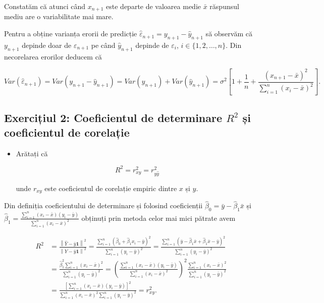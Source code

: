 \documentclass[]{article}
\newenvironment{frshaded*}{%
  \def\FrameCommand{\fboxrule=\FrameRule\fboxsep=\FrameSep \fcolorbox{framecolor}{shadecolor1}}%
  \MakeFramed {\advance\hsize-\width \FrameRestore}}%
{\endMakeFramed}
\newenvironment{rmdblock}[1]
  {\begin{frshaded*}
  \begin{itemize}
  \renewcommand{\labelitemi}{
    \raisebox{-.7\height}[0pt][0pt]{
      {\setkeys{Gin}{width=2em,keepaspectratio}\texttt{[image: images/icons/\#1]}}
    }
  }
  \item
  }
  {
  \end{itemize}
  \end{frshaded*}
  }
\newenvironment{rmdexercise}
  {\begin{rmdblock}{exercise}}
  {\end{rmdblock}}
\begin{document}
Constatăm că atunci când \(x_{n+1}\) este departe de valoarea medie
\(\bar x\) răspunsul mediu are o variabilitate mai mare.

Pentru a obține varianța erorii de predicție
\(\hat\varepsilon_{n+1} = y_{n+1} - \hat y_{n+1}\) să observăm că
\(y_{n+1}\) depinde doar de \(\varepsilon_{n+1}\) pe când
\(\hat y_{n+1}\) depinde de \(\varepsilon_i\), \(i\in\{1,2,\ldots,n\}\).
Din necorelarea erorilor deducem că

\[
  Var(\hat\varepsilon_{n+1}) = Var(y_{n+1} - \hat y_{n+1}) = Var(y_{n+1}) + Var(\hat y_{n+1}) = \sigma^2\left[1 + \frac{1}{n} + \frac{(x_{n+1} - \bar x)^2}{\sum_{i=1}^{n}(x_i - \bar x)^2}\right].
\]

\subsection{\texorpdfstring{Exercițiul 2: Coeficientul de determinare
\(R^2\) și coeficientul de
corelație}{Exercițiul 2: Coeficientul de determinare R\^{}2 și coeficientul de corelație}}\label{exercitiul-2-coeficientul-de-determinare-r2-si-coeficientul-de-corelatie}

\begin{rmdexercise}
Arătați că

\[
  R^2 = r_{xy}^2 = r_{y\hat y}^2
\]

unde \(r_{xy}\) este coeficientul de corelație empiric dintre \(x\) și
\(y\).
\end{rmdexercise}

Din definiția coeficientului de determinare și folosind coeficienții
\(\hat\beta_0 = \bar y - \hat\beta_1 \bar x\) și
\(\hat\beta_1 = \frac{\sum_{i = 1}^{n}(x_i - \bar x)(y_i - \bar y)}{\sum_{i = 1}^{n}(x_i - \bar x)^2}\)
obținuți prin metoda celor mai mici pătrate avem

\begin{align*}
R^2 &= \frac{\left\lVert \hat Y - \bar y \mathbf{1}\right\rVert^2}{\left\lVert Y - \bar y \mathbf{1}\right\rVert^2} = \frac{\sum_{i = 1}^{n}(\hat\beta_0 + \hat\beta_1 x_i - \bar y)^2}{\sum_{i = 1}^{n}(y_i - \bar y)^2} = \frac{\sum_{i = 1}^{n}(\bar y - \hat\beta_1 \bar x + \hat\beta_1\bar x - \bar y)^2}{\sum_{i = 1}^{n}(y_i - \bar y)^2}\\
  &= \frac{\hat\beta_1^2\sum_{i = 1}^{n}(x_i - \bar x)^2}{\sum_{i = 1}^{n}(y_i - \bar y)^2} = \left(\frac{\sum_{i = 1}^{n}(x_i - \bar x)(y_i - \bar y)}{\sum_{i = 1}^{n}(x_i - \bar x)^2}\right)^2\frac{\sum_{i = 1}^{n}(x_i - \bar x)^2}{\sum_{i = 1}^{n}(y_i - \bar y)^2}\\
  & = \frac{\left[\sum_{i = 1}^{n}(x_i - \bar x)(y_i - \bar y)\right]^2}{\sum_{i = 1}^{n}(x_i - \bar x)^2\sum_{i = 1}^{n}(y_i - \bar y)^2} = r_{xy}^2.
\end{align*}
\end{document}
